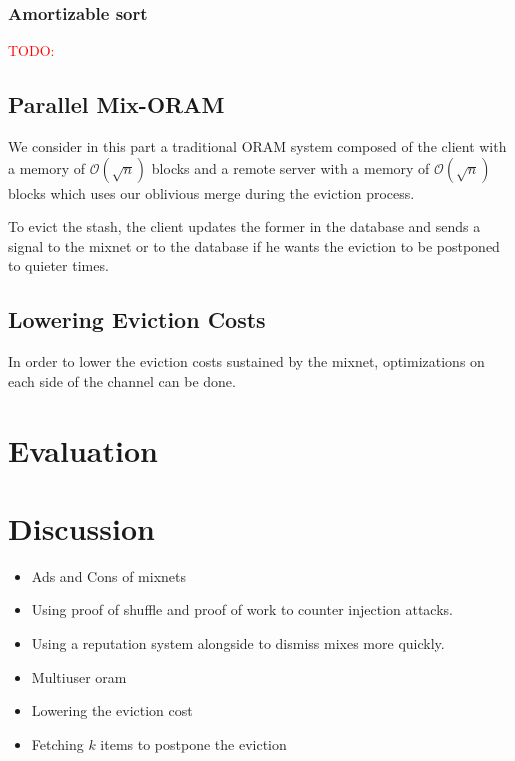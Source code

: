 \documentclass[english,oneside,twocolumn]{article}
\newcommand{\todo}[1]{\textcolor{red}{TODO: #1}}
\begin{document}
\subsubsection{Amortizable sort}

\todo{}


\subsection{Parallel Mix-ORAM}
We consider in this part a traditional ORAM system composed of the client with a memory of $\mathcal{O}\left(\sqrt{n}\right)$ blocks and a remote server with a memory of $\mathcal{O}\left(\sqrt{n}\right)$ blocks which uses our oblivious merge during the eviction process.


To evict the stash, the client updates the former in the database and sends a signal to the mixnet or to the database if he wants the eviction to be postponed to quieter times.

\subsection{Lowering Eviction Costs}

In order to lower the eviction costs sustained by the mixnet, optimizations on each side of the channel can be done.



\section{Evaluation}

\section{Discussion}
\label{Discussion}
\begin{itemize}
 \item Ads and Cons of mixnets
 \item Using proof of shuffle and proof of work to counter injection attacks.
 \item Using a reputation system alongside to dismiss mixes more quickly.
 \item Multiuser oram
 \item Lowering the eviction cost
 \item Fetching $k$ items to postpone the eviction
\end{itemize}
\end{document}
